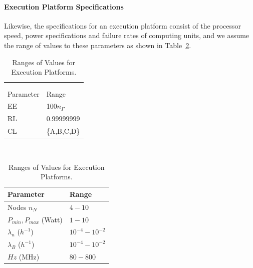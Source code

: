 \paragraph{Execution Platform Specifications}
Likewise, the specifications for an execution platform consist of the processor speed, power specifications and failure rates of computing units, and we assume the range of values to these parameters as shown in Table~\ref{tbl_execpla}.
\begin{table}
	\small
	\parbox{.4\linewidth}{
		\centering
		\begin{tabular}{@{}ll@{}}
			&\\&\\
			\toprule
			Parameter  			& Range\\ 
			\midrule
			EE					 	& 100$n_\Gamma$\\
			RL 						& 0.99999999\\
			CL 						& \{A,B,C,D\}\\
			\bottomrule
		\end{tabular}
		\caption{Ranges of Values for Applications Requirements.}
		\label{tbl_app_ranges}
	}
~
	\parbox{.5\linewidth}{
		\centering\raggedbottom
		\begin{tabular}{@{}ll@{}}
			\toprule
			Parameter  		& Range\\ 
			\midrule
			Nodes $n_N$							& $4-10$\\
			$P_{min},P_{max}$ (Watt)	& $1-10$\\
			$\lambda_n$ ($h^{-1}$) 	& $10^{-4}-10^{-2}$\\
			$\lambda_B$ ($h^{-1}$) 	& $10^{-4}-10^{-2}$\\
			$Hz$ (MHz)			 	& $80-800$\\
			\bottomrule
		\end{tabular}
		\caption{Ranges of Values for Execution Platforms.}
		\label{tbl_execpla}
	}
\end{table}
